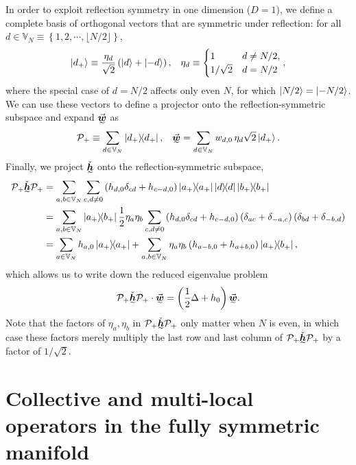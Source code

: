 \documentclass[nofootinbib,notitlepage,11pt]{revtex4-2}
\newcommand{\f}[2]{\dfrac{#1}{#2}} %
\newcommand{\p}[1]{\left(#1\right)} %
\renewcommand{\set}[1]{\left\{#1\right\}} %
\renewcommand{\c}{\cdot} %
\newcommand{\m}{\bm} %
\renewcommand{\v}{\vec} %
\newcommand{\1}{\mathds{1}}
\renewcommand{\P}{\mathcal{P}}
\newcommand{\VV}{\mathbb{V}}
\newcommand{\ut}{\undertilde}
\newcommand{\floor}[1]{\lfloor{#1}\rfloor}
\begin{document}
In order to exploit reflection symmetry in one dimension ($D=1$), we
define a complete basis of orthogonal vectors that are symmetric under
reflection: for all $d\in\VV_N\equiv\set{1,2,\cdots,\floor{N/2}}$,
\begin{align}
  \ket{d_+} \equiv \f{\eta_d}{\sqrt{2}}\p{\ket{d} + \ket{-d}},
  &&
  \eta_d \equiv
  \begin{cases}
    1 & d \ne N/2, \\
    1/\sqrt{2} & d = N/2
  \end{cases},
\end{align}
where the special case of $d=N/2$ affects only even $N$, for which
$\ket{N/2}=\ket{-N/2}$.  We can use these vectors to define a
projector onto the reflection-symmetric subspace and expand
$\ut{\v{\m w}}$ as
\begin{align}
  \P_+ \equiv \sum_{d\in\VV_N} \op{d_+},
  &&
  \ut{\v{\m w}} = \sum_{d\in\VV_N} w_{d,0} \,
  \eta_d \sqrt{2} \ket{d_+}.
\end{align}
Finally, we project $\ut{\check{\m h}}$ onto the reflection-symmetric
subspace,
\begin{align}
  \P_+ \ut{\check{\m h}} \P_+
  &= \sum_{a,b\in\VV_N} \sum_{c,d\ne0}
  \p{h_{d,0} \delta_{cd} + h_{c-d,0}} \op{a_+} \op{d} \op{b_+} \\
  &= \sum_{a,b\in\VV_N} \op{a_+}{b_+} \f12 \eta_a\eta_b
  \sum_{c,d\ne0} \p{h_{d,0} \delta_{cd} + h_{c-d,0}}
  \p{\delta_{ac} + \delta_{-a,c}} \p{\delta_{bd} + \delta_{-b,d}} \\
  &= \sum_{a\in\VV_N} h_{a,0} \op{a_+}
  + \sum_{a,b\in\VV_N} \eta_a\eta_b
  \p{h_{a-b,0} + h_{a+b,0}} \op{a_+}{b_+},
\end{align}
which allows us to write down the reduced eigenvalue problem
\begin{align}
  \P_+ \ut{\check{\m h}} \P_+ \c \ut{\v{\m w}}
  = \p{\f12\Delta + h_0} \ut{\v{\m w}}.
\end{align}
Note that the factors of $\eta_a,\eta_b$ in
$\P_+ \ut{\check{\m h}} \P_+$ only matter when $N$ is even, in which
case these factors merely multiply the last row and last column of
$\P_+ \ut{\check{\m h}} \P_+$ by a factor of $1/\sqrt{2}$.

\section{Collective and multi-local operators in the fully symmetric
  manifold}
\label{sec:multi_to_collective}
\end{document}

